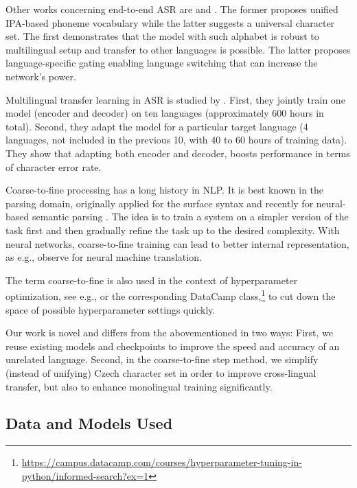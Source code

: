 Other works concerning end-to-end ASR are  and . The former proposes unified IPA-based phoneme vocabulary while the latter suggests a universal character set. The first demonstrates that the model with such alphabet is robust to multilingual setup and transfer to other languages is possible. The latter proposes language-specific gating enabling language switching that can increase the network's power.

Multilingual transfer learning in ASR is studied by . First, they jointly train one model (encoder and decoder) on ten languages (approximately 600 hours in total). Second, they adapt the model %
for a particular target language (4 languages, not included in the previous 10, with 40 to 60 hours of training data). They show that adapting both encoder and decoder, boosts performance in terms of character error rate.

Coarse-to-fine processing  has a long history in NLP. It is best known in the parsing domain, originally applied for the surface syntax  and recently for neural-based semantic parsing . The idea is to train a system on a simpler version of the task first and then gradually refine the task up to the desired complexity. With neural networks, coarse-to-fine training can lead to better internal representation, as e.g.,  observe for neural machine translation.

The term coarse-to-fine is also used in the context of hyperparameter optimization, see e.g.,  or the corresponding DataCamp class,\footnote{\url{https://campus.datacamp.com/courses/hyperparameter-tuning-in-python/informed-search?ex=1}} to cut down the space of possible hyperparameter settings quickly.

Our work is novel and differs from the abovementioned in two ways: First, we reuse existing models and checkpoints to improve the speed and accuracy of an unrelated language. Second, in the coarse-to-fine step method, we simplify (instead of unifying) Czech character set in order to improve cross-lingual transfer, but also to enhance monolingual training significantly.


\subsection{Data and Models Used}
\label{sec:data_models}

